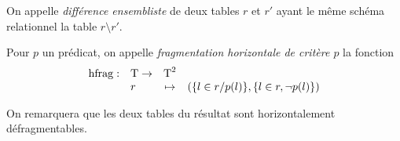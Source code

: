 \begin{defi}
	On appelle \emph{différence ensembliste}
	de deux tables $r$ et $r'$ ayant le même schéma relationnel
	la table $r \setminus r'$.
\end{defi}

\begin{defi}
	Pour $p$ un prédicat, on appelle \emph{fragmentation horizontale 
		de critère $p$}
	la fonction
	$$
	\begin{array}{llcl}
	\operatorname{hfrag} : & \operatorname{T} \rightarrow & \operatorname{T}^2 \\
			& r & \mapsto & (\{l \in r / p(l)\} , \{l \in r, \neg p(l)\})
	\end{array}
	$$
	
	On remarquera que les deux tables du résultat sont horizontalement défragmentables.
\end{defi}